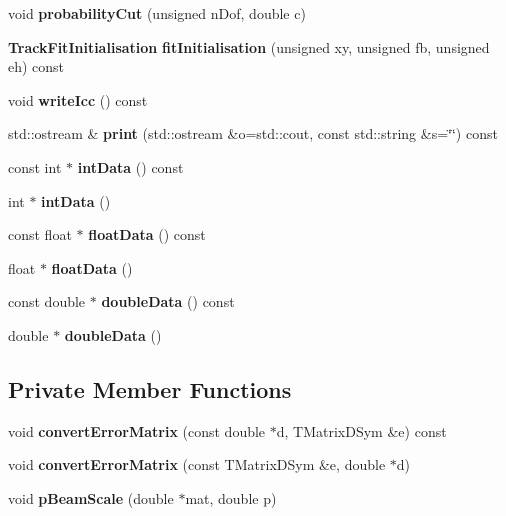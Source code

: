\begin{DoxyCompactItemize}
\item 
void {\bfseries probability\-Cut} (unsigned n\-Dof, double c)\label{classTBTrack_1_1FitConstants_a19530322178881f38211053231b8719c}

\item 
{\bf Track\-Fit\-Initialisation} {\bfseries fit\-Initialisation} (unsigned xy, unsigned fb, unsigned eh) const \label{classTBTrack_1_1FitConstants_a39d3a5bdfce8fe17387e1470d00543b6}

\item 
void {\bfseries write\-Icc} () const \label{classTBTrack_1_1FitConstants_ac5738f5f948c0cee82dab1ca7b5b756b}

\item 
std\-::ostream \& {\bfseries print} (std\-::ostream \&o=std\-::cout, const std\-::string \&s=\char`\"{}\char`\"{}) const \label{classTBTrack_1_1FitConstants_ad62ddbd9b8fd5f827fccabf35691abf1}

\item 
const int $\ast$ {\bfseries int\-Data} () const \label{classTBTrack_1_1FitConstants_a300c624cc611cb716f86dd7692c6f2ab}

\item 
int $\ast$ {\bfseries int\-Data} ()\label{classTBTrack_1_1FitConstants_a40b7f0a0888a062b84b4c0f47e7aa932}

\item 
const float $\ast$ {\bfseries float\-Data} () const \label{classTBTrack_1_1FitConstants_ae20c4d5c95c45bad29c9b8f364614e78}

\item 
float $\ast$ {\bfseries float\-Data} ()\label{classTBTrack_1_1FitConstants_abb376a6b05cc1c2bafb24ba44a230348}

\item 
const double $\ast$ {\bfseries double\-Data} () const \label{classTBTrack_1_1FitConstants_a05fa985c01f9de23dbffbe275afa0127}

\item 
double $\ast$ {\bfseries double\-Data} ()\label{classTBTrack_1_1FitConstants_a53ba2da4d9d0a108988e207f665c88bd}

\end{DoxyCompactItemize}
\subsection*{Private Member Functions}
\begin{DoxyCompactItemize}
\item 
void {\bfseries convert\-Error\-Matrix} (const double $\ast$d, T\-Matrix\-D\-Sym \&e) const \label{classTBTrack_1_1FitConstants_a239bf750e8846e198310ccd5dfc27b51}

\item 
void {\bfseries convert\-Error\-Matrix} (const T\-Matrix\-D\-Sym \&e, double $\ast$d)\label{classTBTrack_1_1FitConstants_aed80acea11b9312ca325f0032c2aa624}

\item 
void {\bfseries p\-Beam\-Scale} (double $\ast$mat, double p)\label{classTBTrack_1_1FitConstants_a9bb5f5ac9c07dfb702e48c48a1dce9ea}

\end{DoxyCompactItemize}
